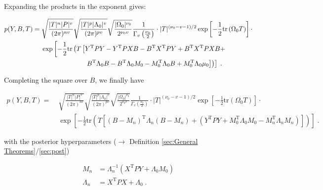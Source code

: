 \documentclass[a4paper,12pt,twoside]{book}
\begin{document}
Expanding the products in the exponent gives:

\begin{equation} \label{eq:mblr-post-GLM-NW-JL-s3}
\begin{split}
p(Y,B,T) = \; & \sqrt{\frac{|T|^n |P|^v}{(2 \pi)^{nv}}} \sqrt{\frac{|T|^p |\Lambda_0|^v}{(2 \pi)^{pv}}} \sqrt{\frac{|\Omega_0|^{\nu_0}}{2^{\nu_0 v}}} \frac{1}{\Gamma_v \left( \frac{\nu_0}{2} \right)} \cdot |T|^{(\nu_0-v-1)/2} \exp\left[ -\frac{1}{2} \mathrm{tr}\left( \Omega_0 T \right) \right] \cdot \\
& \exp\left[ -\frac{1}{2} \mathrm{tr}\left( T \left[ Y^\mathrm{T} P Y - Y^\mathrm{T} P X B - B^\mathrm{T} X^\mathrm{T} P Y + B^\mathrm{T} X^\mathrm{T} P X B + \right. \right. \right. \\
& \hphantom{\exp\left[ -\frac{1}{2} \mathrm{tr}\left( T \left[ \right. \right. \right. \!\!\!} \; \left. \left. \left. B^\mathrm{T} \Lambda_0 B - B^\mathrm{T} \Lambda_0 M_0 - M_0^\mathrm{T} \Lambda_0 B + M_0^\mathrm{T} \Lambda_0 \mu_0 \right] \right) \right] \; .
\end{split}
\end{equation}

Completing the square over $B$, we finally have

\begin{equation} \label{eq:mblr-post-GLM-NW-JL-s4}
\begin{split}
p(Y,B,T) = \; & \sqrt{\frac{|T|^n |P|^v}{(2 \pi)^{nv}}} \sqrt{\frac{|T|^p |\Lambda_0|^v}{(2 \pi)^{pv}}} \sqrt{\frac{|\Omega_0|^{\nu_0}}{2^{\nu_0 v}}} \frac{1}{\Gamma_v \left( \frac{\nu_0}{2} \right)} \cdot |T|^{(\nu_0-v-1)/2} \exp\left[ -\frac{1}{2} \mathrm{tr}\left( \Omega_0 T \right) \right] \cdot \\
& \exp\left[ -\frac{1}{2} \mathrm{tr}\left( T \left[ (B-M_n)^\mathrm{T} \Lambda_n (B-M_n) + (Y^\mathrm{T} P Y + M_0^\mathrm{T} \Lambda_0 M_0 - M_n^\mathrm{T} \Lambda_n M_n) \right] \right) \right] \; .
\end{split}
\end{equation}

with the posterior hyperparameters ($\rightarrow$ Definition \ref{sec:General Theorems}/\ref{sec:post})

\begin{equation} \label{eq:mblr-post-GLM-NW-post-B-par}
\begin{split}
M_n &= \Lambda_n^{-1} (X^\mathrm{T} P Y + \Lambda_0 M_0) \\
\Lambda_n &= X^\mathrm{T} P X + \Lambda_0 \; .
\end{split}
\end{equation}
\end{document}
